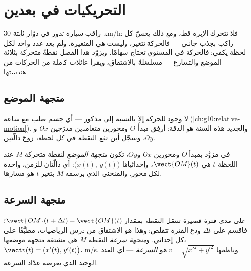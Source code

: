 \chapter{التحريكيات في بعدين}\label{ch:g12:kinematics-2d}

راقب سيارة تدور في دوّار  ثابتة \qty{30}{km/h}: فلا تتحرك
الإبرة قط، ومع ذلك يحسّ كل راكب بجذب جانبي --- فالحركة
تتغير، وليست  هي المتغيرة. ولم يعد عدد واحد لكل لحظة
يكفي: فالحركة في المستوي تحتاج سهامًا. ويزوّد هذا الفصل
نقطةً متحركة بثلاثة --- الموضع  والتسارع ---
مسلسَلةً بالاشتقاق، ويقرأ عائلات كاملة من الحركات من
هندستها.

\section{متجهة الموضع}

لا وجود للحركة إلا بالنسبة إلى  مذكور --- أي جسم صلب
مع ساعة (\cref{ch:g10:relative-motion}). والجديد هذه السنة هو
الدقة: أرفِق  مبدأً $O$ ومحورين متعامدين
مدرّجين $Ox$ و$Oy$، وسجّل أين تقع النقطة في كل
لحظة، زوجَ دالّتين.

\begin{definition}\label{def:g12:kinematics-2d:position}
في  مزوَّد بمبدأ $O$ ومحورين $Ox$ و$Oy$، تكون
\emph{متجهة الموضع} لنقطة متحركة $M$
عند اللحظة $t$ هي $\vect{OM}(t)$، وإحداثياها
$\bigl(x(t),\, y(t)\bigr)$: أي دالّتان للزمن، واحدة لكل محور.
والمنحني الذي يرسمه $M$ بتغير $t$ هو مسارها.
\end{definition}

\section{متجهة السرعة}

\begin{definition}\label{def:g12:kinematics-2d:velocity}
على مدى فترة قصيرة تنتقل النقطة بمقدار
$\vect{OM}(t+\Delta t) - \vect{OM}(t)$؛ فاقسم على $\Delta t$ ودع
الفترة تتقلص: وهذا هو الاشتقاق من درس الرياضيات، مطبَّقًا
على كل إحداثي. و\emph{متجهة سرعة}
النقطة $M$ هي مشتقة متجهة موضعها،
$\vect v(t) = \bigl(x'(t),\, y'(t)\bigr)$، 
\unit{m/s}. وناظمها $v = \sqrt{x'^2 + y'^2}$ هو
\emph{السرعة} --- أي العدد الوحيد الذي يعرضه عدّاد السرعة.
\end{definition}

